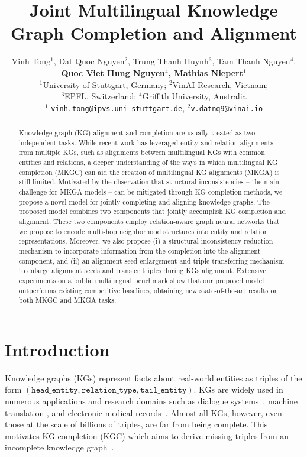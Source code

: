 \documentclass[11pt]{article}
\title{Joint Multilingual Knowledge Graph Completion and Alignment}
\author{Vinh Tong$^1$, Dat Quoc Nguyen$^2$, Trung Thanh Huynh$^3$, Tam Thanh Nguyen$^4$, \\ \textbf{Quoc Viet Hung Nguyen$^4$, Mathias Niepert$^1$}\\
  $^1$University of Stuttgart, Germany; $^2$VinAI Research, Vietnam; \\ $^3$EPFL, Switzerland;  $^4$Griffith University, Australia\\
  $^1$ \texttt{vinh.tong@ipvs.uni-stuttgart.de}, $^2$\texttt{v.datnq9@vinai.io} }
\begin{document}
\maketitle

\begin{abstract}

Knowledge graph (KG) alignment and completion are usually treated as two independent tasks. While recent work has leveraged entity and relation alignments from multiple KGs, such as alignments between multilingual KGs with common entities and relations, a deeper understanding of the ways in which multilingual KG completion (MKGC) can aid the creation of multilingual KG alignments (MKGA) is still limited. Motivated by the observation that structural inconsistencies -- the main challenge for MKGA models -- can be mitigated through KG completion methods, we propose a novel model for jointly completing and aligning knowledge graphs. The proposed model combines two components that jointly accomplish KG completion and alignment. These two components employ relation-aware graph neural networks that we propose to encode multi-hop neighborhood structures into entity and relation representations. Moreover, we also propose (i) a structural inconsistency reduction mechanism to incorporate information from the completion into the alignment component, and (ii) an alignment seed enlargement and triple transferring mechanism to enlarge alignment seeds and transfer triples during KGs alignment. Extensive experiments on a public multilingual benchmark show that our proposed model outperforms existing competitive baselines, obtaining new state-of-the-art results on both MKGC and MKGA tasks.

\end{abstract}

\section{Introduction}


Knowledge graphs (KGs) represent facts about real-world entities as triples of the form $(\mathtt{head\_entity}, \mathtt{relation\_type}, \mathtt{tail\_entity})$. KGs are widely used in numerous applications and research domains such as dialogue systems~\cite{jung2020attnio}, machine translation \cite{zhao2020knowledge}, and electronic medical records~\cite{rotmensch2017learning}. Almost all KGs, however, even those at the scale of billions of triples, are far from being complete. This motivates KG completion (KGC) which aims to derive missing triples from an incomplete knowledge graph~\cite{bordes2013translating, wang2014knowledge,yang2014embedding, pmlr-v48-trouillon16, liu2017analogical,dettmers2018convolutional,Nguyen2020KGC,Ji_2021,tong2021two}. 
\end{document}
